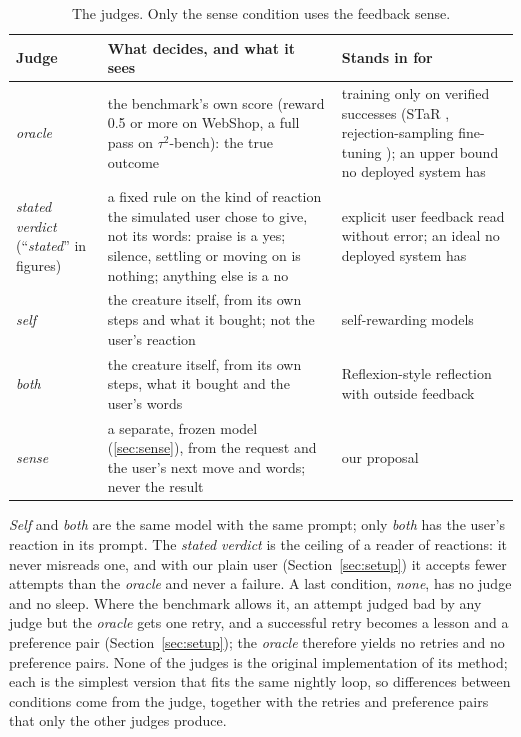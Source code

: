 \begin{table}[t]
\centering\small
\caption{The judges. Only the sense condition uses the feedback sense.}\label{tab:3}
\begin{tabular}{@{}
  >{\raggedright\arraybackslash}p{}
  >{\raggedright\arraybackslash}p{}
  >{\raggedright\arraybackslash}p{}@{}}
\toprule
Judge & What decides, and what it sees & Stands in for \\
\midrule
\emph{oracle} & the benchmark's own score (reward 0.5 or more on WebShop, a full pass on $\tau^2$-bench): the true outcome & training only on verified successes (STaR \cite{zelikman2022star}, rejection-sampling fine-tuning \cite{yuan2023scaling}); an upper bound no deployed system has \\
\emph{stated verdict} (``\emph{stated}'' in figures) & a fixed rule on the kind of reaction the simulated user chose to give, not its words: praise is a yes; silence, settling or moving on is nothing; anything else is a no & explicit user feedback read without error; an ideal no deployed system has \\
\emph{self} & the creature itself, from its own steps and what it bought; not the user's reaction & self-rewarding models \cite{yuan2024selfrewarding} \\
\emph{both} & the creature itself, from its own steps, what it bought and the user's words & Reflexion-style reflection with outside feedback \cite{shinn2023reflexion} \\
\emph{sense} & a separate, frozen model (\ref{sec:sense}), from the request and the user's next move and words; never the result & our proposal \\
\bottomrule
\end{tabular}
\end{table}

\emph{Self} and \emph{both} are the same model with the same prompt; only \emph{both} has the user's reaction in its prompt. The \emph{stated verdict} is the ceiling of a reader of reactions: it never misreads one, and with our plain user (Section~\ref{sec:setup}) it accepts fewer attempts than the \emph{oracle} and never a failure. A last condition, \emph{none}, has no judge and no sleep. Where the benchmark allows it, an attempt judged bad by any judge but the \emph{oracle} gets one retry, and a successful retry becomes a lesson and a preference pair (Section~\ref{sec:setup}); the \emph{oracle} therefore yields no retries and no preference pairs. None of the judges is the original implementation of its method; each is the simplest version that fits the same nightly loop, so differences between conditions come from the judge, together with the retries and preference pairs that only the other judges produce.

